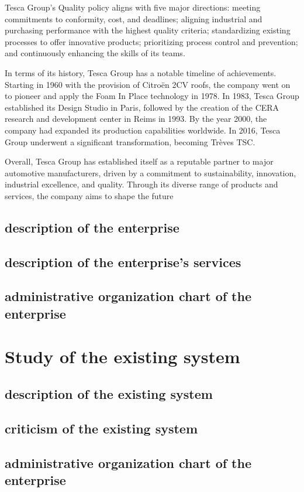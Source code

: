 Tesca Group's Quality policy aligns with five major directions: meeting commitments to conformity, cost, and deadlines; aligning industrial and purchasing performance with the highest quality criteria; standardizing existing processes to offer innovative products; prioritizing process control and prevention; and continuously enhancing the skills of its teams.

In terms of its history, Tesca Group has a notable timeline of achievements. Starting in 1960 with the provision of Citroën 2CV roofs, the company went on to pioneer and apply the Foam In Place technology in 1978. In 1983, Tesca Group established its Design Studio in Paris, followed by the creation of the CERA research and development center in Reims in 1993. By the year 2000, the company had expanded its production capabilities worldwide. In 2016, Tesca Group underwent a significant transformation, becoming Trèves TSC.

Overall, Tesca Group has established itself as a reputable partner to major automotive manufacturers, driven by a commitment to sustainability, innovation, industrial excellence, and quality. Through its diverse range of products and services, the company aims to shape the future
\subsection{description of the  enterprise }
\subsection{description of the  enterprise's services}
\subsection{administrative organization chart of the enterprise}
\vspace{1em}
\section{Study of the existing system}
\subsection{description of the existing system }
\subsection{criticism of the existing system}
\subsection{administrative organization chart of the enterprise}
\vspace{1em}

